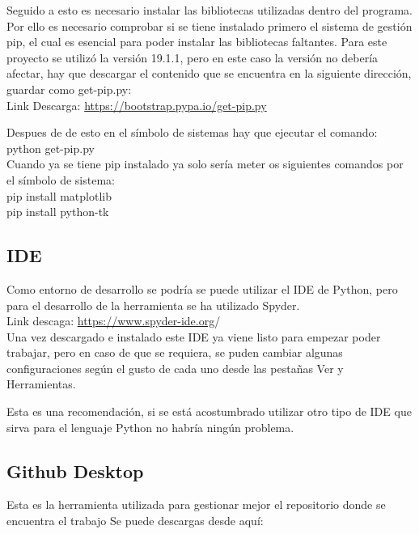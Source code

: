 Seguido a esto es necesario instalar las bibliotecas utilizadas dentro del programa. Por ello es necesario comprobar si se tiene instalado primero el sistema de gestión pip, el cual es esencial para poder instalar las bibliotecas faltantes.
Para este proyecto se utilizó la versión 19.1.1, pero en este caso la versión no debería afectar, hay que descargar el contenido que se encuentra en la siguiente dirección, guardar como get-pip.py:\\

Link Descarga: \url{https://bootstrap.pypa.io/get-pip.py}

Despues de de esto en el símbolo de sistemas hay que ejecutar el comando: python get-pip.py\\

Cuando ya se tiene pip instalado ya solo sería meter os siguientes comandos por el símbolo de sistema:\\
pip install matplotlib\\
pip install python-tk\\


\subsection{IDE}
Como entorno de desarrollo se podría se puede utilizar el IDE de Python, pero para el desarrollo de la herramienta se ha utilizado Spyder. \\

Link descaga: \url{https://www.spyder-ide.org}/\\

Una vez descargado e instalado este IDE ya viene listo para empezar poder trabajar, pero en caso de que se requiera, se puden cambiar algunas configuraciones según el gusto de cada uno desde las pestañas Ver y Herramientas.\\


Esta es una recomendación, si se está acostumbrado utilizar otro tipo de IDE que sirva para el lenguaje Python no habría ningún problema.\\

\subsection{Github Desktop}

Esta es la herramienta utilizada para gestionar mejor el repositorio donde se encuentra el trabajo
Se puede descargas desde aquí: 

